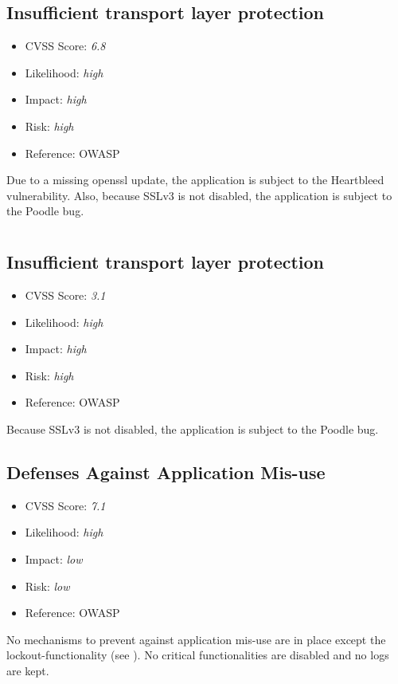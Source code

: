 \subsection{Insufficient transport layer protection} \label{over:vuln_9}
\begin{itemize}
	\item CVSS Score: \textit{6.8}
	\item Likelihood: \textit{high}
	\item Impact: \textit{high}
	\item Risk: \textit{high}
	\item Reference: OWASP 
\end{itemize}
Due to a missing openssl update, the application is subject to the Heartbleed vulnerability. Also, because SSLv3 is not disabled, the application is subject to the Poodle bug.

\section{\gnb}
\subsection{Insufficient transport layer protection} \label{over:vuln_10}
\begin{itemize}
	\item CVSS Score: \textit{3.1}
	\item Likelihood: \textit{high}
	\item Impact: \textit{high}
	\item Risk: \textit{high}
	\item Reference: OWASP 
\end{itemize}
Because SSLv3 is not disabled, the application is subject to the Poodle bug.


\subsection{Defenses Against Application Mis-use} \label{over:vuln_11}
\begin{itemize}
	\item CVSS Score: \textit{7.1}
	\item Likelihood: \textit{high}
	\item Impact: \textit{low}
	\item Risk: \textit{low}
	\item Reference: OWASP 
\end{itemize}
No mechanisms to prevent against application mis-use are in place except the lockout-functionality (see ). No critical functionalities are disabled and no logs are kept.

